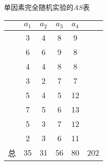 \begin{margintable}
	\centering
	\caption{单因素完全随机实验的$AS$表}
	{
		\begin{tabular}{cccccc}
			\toprule
    			     & $a_1$ &  $a_2$ &  $a_3$ &  $a_4$ & \\
    			     \midrule
                              & \cellcolor[rgb]{ .949,  .949,  .949}3 & \cellcolor[rgb]{ .949,  .949,  .949}4 & \cellcolor[rgb]{ .949,  .949,  .949}8 & \cellcolor[rgb]{ .949,  .949,  .949}9 &  \\
                              & \cellcolor[rgb]{ .949,  .949,  .949}6 & \cellcolor[rgb]{ .949,  .949,  .949}6 & \cellcolor[rgb]{ .949,  .949,  .949}9 & \cellcolor[rgb]{ .949,  .949,  .949}8 &  \\
                              & \cellcolor[rgb]{ .949,  .949,  .949}4 & \cellcolor[rgb]{ .949,  .949,  .949}4 & \cellcolor[rgb]{ .949,  .949,  .949}8 & \cellcolor[rgb]{ .949,  .949,  .949}8 &  \\
                              & \cellcolor[rgb]{ .949,  .949,  .949}3 & \cellcolor[rgb]{ .949,  .949,  .949}2 & \cellcolor[rgb]{ .949,  .949,  .949}7 & \cellcolor[rgb]{ .949,  .949,  .949}7 &  \\
                              & \cellcolor[rgb]{ .949,  .949,  .949}5 & \cellcolor[rgb]{ .949,  .949,  .949}4 & \cellcolor[rgb]{ .949,  .949,  .949}5 & \cellcolor[rgb]{ .949,  .949,  .949}12 &  \\
                              & \cellcolor[rgb]{ .949,  .949,  .949}7 & \cellcolor[rgb]{ .949,  .949,  .949}5 & \cellcolor[rgb]{ .949,  .949,  .949}6 & \cellcolor[rgb]{ .949,  .949,  .949}13 &  \\
                              & \cellcolor[rgb]{ .949,  .949,  .949}5 & \cellcolor[rgb]{ .949,  .949,  .949}3 & \cellcolor[rgb]{ .949,  .949,  .949}7 & \cellcolor[rgb]{ .949,  .949,  .949}12 &  \\
                              & \cellcolor[rgb]{ .949,  .949,  .949}2 & \cellcolor[rgb]{ .949,  .949,  .949}3 & \cellcolor[rgb]{ .949,  .949,  .949}6 & \cellcolor[rgb]{ .949,  .949,  .949}11 &  \\
                              \midrule
                        总     & \cellcolor[rgb]{ .886,  .937,  .855}35 & \cellcolor[rgb]{ .886,  .937,  .855}31 & \cellcolor[rgb]{ .886,  .937,  .855}56 & \cellcolor[rgb]{ .886,  .937,  .855}80 & \cellcolor[rgb]{ .867,  .922,  .969}202 \\
			\bottomrule
		\end{tabular}
	}
\end{margintable}

